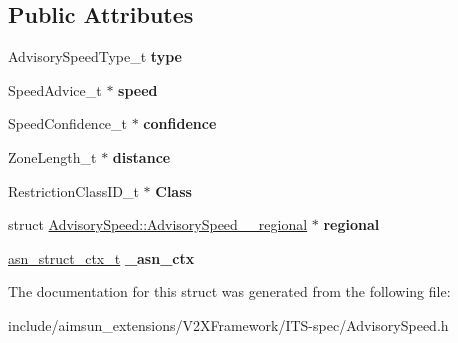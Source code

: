 \subsection*{Public Attributes}
\begin{DoxyCompactItemize}
\item 
Advisory\+Speed\+Type\+\_\+t {\bfseries type}\hypertarget{structAdvisorySpeed_a764accba96692fe68bc0a8d783a3d831}{}\label{structAdvisorySpeed_a764accba96692fe68bc0a8d783a3d831}

\item 
Speed\+Advice\+\_\+t $\ast$ {\bfseries speed}\hypertarget{structAdvisorySpeed_aaa81ebae74a2c0bff13f61f23c21f8a0}{}\label{structAdvisorySpeed_aaa81ebae74a2c0bff13f61f23c21f8a0}

\item 
Speed\+Confidence\+\_\+t $\ast$ {\bfseries confidence}\hypertarget{structAdvisorySpeed_aafa1266bb3ad181d7bf24ffea4a790a5}{}\label{structAdvisorySpeed_aafa1266bb3ad181d7bf24ffea4a790a5}

\item 
Zone\+Length\+\_\+t $\ast$ {\bfseries distance}\hypertarget{structAdvisorySpeed_a3bbbaecc721df88cc190b7c65da6496b}{}\label{structAdvisorySpeed_a3bbbaecc721df88cc190b7c65da6496b}

\item 
Restriction\+Class\+I\+D\+\_\+t $\ast$ {\bfseries Class}\hypertarget{structAdvisorySpeed_a151349f94c08d71e06fd76fd8db08ae3}{}\label{structAdvisorySpeed_a151349f94c08d71e06fd76fd8db08ae3}

\item 
struct \hyperlink{structAdvisorySpeed_1_1AdvisorySpeed____regional}{Advisory\+Speed\+::\+Advisory\+Speed\+\_\+\+\_\+regional} $\ast$ {\bfseries regional}\hypertarget{structAdvisorySpeed_a2f332ca0ed4422d9cab1dca89fc9a325}{}\label{structAdvisorySpeed_a2f332ca0ed4422d9cab1dca89fc9a325}

\item 
\hyperlink{structasn__struct__ctx__s}{asn\+\_\+struct\+\_\+ctx\+\_\+t} {\bfseries \+\_\+asn\+\_\+ctx}\hypertarget{structAdvisorySpeed_a47cc4c24645c8a03ed178f4d3e2e0970}{}\label{structAdvisorySpeed_a47cc4c24645c8a03ed178f4d3e2e0970}

\end{DoxyCompactItemize}


The documentation for this struct was generated from the following file\+:\begin{DoxyCompactItemize}
\item 
include/aimsun\+\_\+extensions/\+V2\+X\+Framework/\+I\+T\+S-\/spec/Advisory\+Speed.\+h\end{DoxyCompactItemize}

